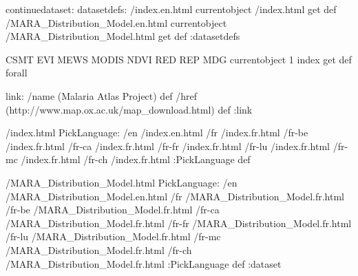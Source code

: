 \begin{ingrid}
continuedataset:
datasetdefs:
/index.en.html currentobject /index.html get def
/MARA_Distribution_Model.en.html currentobject /MARA_Distribution_Model.html get def
:datasetdefs

{ CSMT EVI MEWS MODIS NDVI RED REP MDG } { currentobject 1 index get def } forall

link:
/name (Malaria Atlas Project) def
/href (http://www.map.ox.ac.uk/map_download.html) def
:link

/index.html {
PickLanguage:
/en /index.en.html
/fr /index.fr.html
/fr-be /index.fr.html
/fr-ca /index.fr.html
/fr-fr /index.fr.html
/fr-lu /index.fr.html
/fr-mc /index.fr.html
/fr-ch /index.fr.html
:PickLanguage
} def

/MARA_Distribution_Model.html {
PickLanguage:
/en /MARA_Distribution_Model.en.html
/fr /MARA_Distribution_Model.fr.html
/fr-be /MARA_Distribution_Model.fr.html
/fr-ca /MARA_Distribution_Model.fr.html
/fr-fr /MARA_Distribution_Model.fr.html
/fr-lu /MARA_Distribution_Model.fr.html
/fr-mc /MARA_Distribution_Model.fr.html
/fr-ch /MARA_Distribution_Model.fr.html
:PickLanguage
} def
:dataset
\end{ingrid}
